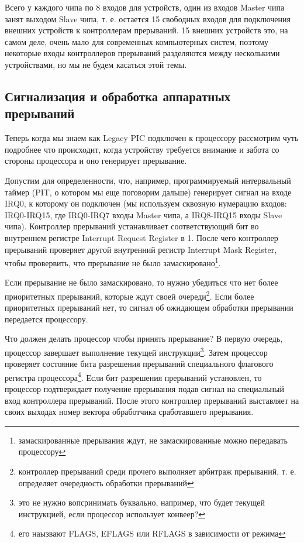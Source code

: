 Всего у каждого чипа по 8 входов для устройств, один из входов Master чипа
занят выходом Slave чипа, т. е. остается 15 свободных входов для подключения
внешних устройств к контроллерам прерываний. 15 внешних устройств это, на самом
деле, очень мало для современных компьютерных систем, поэтому некоторые входы
контроллеров прерываний разделяются между несколькими устройствами, но мы не
будем касаться этой темы.

\subsection{Сигнализация и обработка аппаратных прерываний}

Теперь когда мы знаем как Legacy PIC подключен к процессору рассмотрим чуть
подробнее что происходит, когда устройству требуется внимание и забота со
стороны процессора и оно генерирует прерывание.

Допустим для определенности, что, например, программируемый интервальный таймер
(PIT, о котором мы еще поговорим дальше) генерирует сигнал на входе IRQ0, к которому он подключен (мы используем сквозную нумерацию входов: IRQ0-IRQ15, где
IRQ0-IRQ7 входы Master чипа, а IRQ8-IRQ15 входы Slave чипа). Контроллер
прерываний устанавливает соответствующий бит во внутреннем регистре Interrupt
Request Register в 1. После чего контроллер прерываний проверяет другой
внутренний регистр Interrupt Mask Register, чтобы провервить, что прерывание не
было замаскировано\footnote{замаскированные прерывания ждут, не замаскированные
можно передавать процессору}.

Если прерывание не было замаскировано, то нужно убедиться что нет более
приоритетных прерываний, которые ждут своей очереди\footnote{контроллер
прерываний среди прочего выполняет арбитраж прерываний, т. е. определяет
очередность обработки прерываний}. Если более приоритетных прерываний нет, то
сигнал об ожидающем обработки прерывании передается процессору.

Что должен делать процессор чтобы принять прерывание? В первую очередь,
процессор завершает выполнение текущей инструкции\footnote{это не нужно
вопсринимать буквально, например, что будет текущей инструкцией, если процессор
использует конвеер?}. Затем процессор проверяет состояние бита разрешения
прерываний специального флагового регистра процессора\footnote{его наызвают
FLAGS, EFLAGS или RFLAGS в зависимости от режима}. Если бит разрешения
прерываний установлен, то процессор подтверждает получение прерывания подав
сигнал на специальный вход контроллера прерываний. После этого контроллер
прерываний выставляет на своих выходах номер вектора обработчика сработавшего
прерывания.

